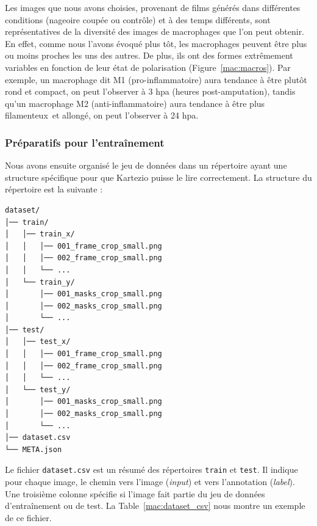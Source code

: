 \documentclass[a4paper,12pt]{report}
\newcommand{\figref}[1]{Figure~\ref{#1}}
\newcommand{\tabref}[1]{Table~\ref{#1}}
\begin{document}


Les images que nous avons choisies, provenant de films générés dans différentes conditions (nageoire coupée ou contrôle) et à des temps différents, sont représentatives de la diversité des images de macrophages que l'on peut obtenir. En effet, comme nous l'avons évoqué plus tôt, les macrophages peuvent être plus ou moins proches les uns des autres. De plus, ils ont des formes extrêmement variables en fonction de leur état de polarisation (\figref{mac:macros}). Par exemple, un macrophage dit M1 (pro-inflammatoire) aura tendance à être plutôt rond et compact, on peut l'observer à 3 hpa (heures post-amputation), tandis qu'un macrophage M2 (anti-inflammatoire) aura tendance à être plus \og filamenteux\fg\ et allongé, on peut l'observer à 24 hpa.




\subsubsection{Préparatifs pour l'entraînement}

Nous avons ensuite organisé le jeu de données dans un répertoire ayant une structure spécifique pour que Kartezio puisse le lire correctement. La structure du répertoire est la suivante :
\vspace{-0.4cm}
\begin{verbatim}
dataset/
│── train/
│   │── train_x/
│   │   │── 001_frame_crop_small.png
│   │   │── 002_frame_crop_small.png
│   │   └── ...
│   └── train_y/
│       │── 001_masks_crop_small.png
│       │── 002_masks_crop_small.png
│       └── ...
│── test/
│   │── test_x/
│   │   │── 001_frame_crop_small.png
│   │   │── 002_frame_crop_small.png
│   │   └── ...
│   └── test_y/
│       │── 001_masks_crop_small.png
│       │── 002_masks_crop_small.png
│       └── ...
│── dataset.csv
└── META.json
\end{verbatim}

Le fichier \texttt{dataset.csv} est un résumé des répertoires \texttt{train} et \texttt{test}. Il indique pour chaque image, le chemin vers l'image (\textit{input}) et vers l'annotation (\textit{label}). Une troisième colonne spécifie si l'image fait partie du jeu de données d'entraînement ou de test. La \tabref{mac:dataset_csv} nous montre un exemple de ce fichier.
\end{document}
